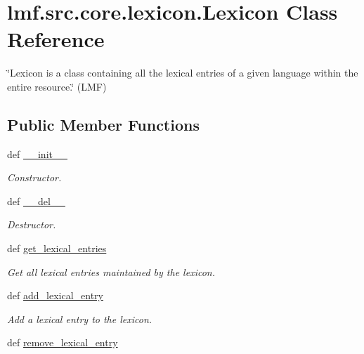 \hypertarget{classlmf_1_1src_1_1core_1_1lexicon_1_1_lexicon}{\section{lmf.\+src.\+core.\+lexicon.\+Lexicon Class Reference}
\label{classlmf_1_1src_1_1core_1_1lexicon_1_1_lexicon}
}


\char`\"{}\+Lexicon is a class containing all the lexical entries of a given language within the entire resource.\char`\"{} (L\+M\+F)  


\subsection*{Public Member Functions}
\begin{DoxyCompactItemize}
\item 
def \hyperlink{classlmf_1_1src_1_1core_1_1lexicon_1_1_lexicon_a82ea3cefcbda289ccdd5d9f9e4dcb501}{\+\_\+\+\_\+init\+\_\+\+\_\+}
\begin{DoxyCompactList}\small\item\em Constructor. \end{DoxyCompactList}\item 
def \hyperlink{classlmf_1_1src_1_1core_1_1lexicon_1_1_lexicon_a50ac4bdb09d0854845ebbb0817fd66b3}{\+\_\+\+\_\+del\+\_\+\+\_\+}
\begin{DoxyCompactList}\small\item\em Destructor. \end{DoxyCompactList}\item 
def \hyperlink{classlmf_1_1src_1_1core_1_1lexicon_1_1_lexicon_a148e94a7d0a744b510ee81e53c51e0b0}{get\+\_\+lexical\+\_\+entries}
\begin{DoxyCompactList}\small\item\em Get all lexical entries maintained by the lexicon. \end{DoxyCompactList}\item 
def \hyperlink{classlmf_1_1src_1_1core_1_1lexicon_1_1_lexicon_aaa470820fbda4be04d6fe9139e761773}{add\+\_\+lexical\+\_\+entry}
\begin{DoxyCompactList}\small\item\em Add a lexical entry to the lexicon. \end{DoxyCompactList}\item 
def \hyperlink{classlmf_1_1src_1_1core_1_1lexicon_1_1_lexicon_a36f348d30a1193d216ac7dacd5f085be}{remove\+\_\+lexical\+\_\+entry}

\end{DoxyCompactItemize}
